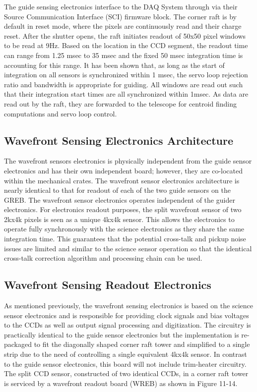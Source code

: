 The guide sensing electronics interface to the DAQ System through via their Source Communication
Interface (SCI) firmware block. The corner raft is by default in reset mode, where the pixels are
continuously read and their charge reset. After the shutter opens, the raft initiates readout of 50x50
pixel windows to be read at 9Hz. Based on the location in the CCD segment, the readout time can range
from 1.25 msec to 35 msec and the fixed 50 msec integration time is accounting for this range. It has
been shown that, as long as the start of integration on all sensors is synchronized within 1 msec, the
servo loop rejection ratio and bandwidth is appropriate for guiding. All windows are read out such that
their integration start times are all synchronized within 1msec. As data are read out by the raft, they are
forwarded to the telescope for centroid finding computations and servo loop control.

\subsection{Wavefront Sensing Electronics Architecture}

The wavefront sensors electronics is physically independent from the guide sensor electronics and has
their own independent board; however, they are co-located within the mechanical crates. The
wavefront sensor electronics architecture is nearly identical to that for readout of each of the two guide
sensors on the GREB. The wavefront sensor electronics operates independent of the guider electronics.
For electronics readout purposes, the split wavefront sensor of two 2kx4k pixels is seen as a unique
4kx4k sensor. This allows the electronics to operate fully synchronously with the science electronics as
they share the same integration time. This guarantees that the potential cross-talk and pickup noise
issues are limited and similar to the science sensor operation so that the identical cross-talk correction
algorithm and processing chain can be used.

\subsection{Wavefront Sensing Readout Electronics}

As mentioned previously, the wavefront sensing electronics is based on the science sensor electronics
and is responsible for providing clock signals and bias voltages to the CCDs as well as output signal
processing and digitization. The circuitry is practically identical to the guide sensor electronics but the
implementation is re-packaged to fit the diagonally shaped corner raft tower and simplified to a single
strip due to the need of controlling a single equivalent 4kx4k sensor. In contrast to the guide sensor
electronics, this board will not include trim-heater circuitry.
The split CCD sensor, constructed of two identical CCDs, in a corner raft tower is serviced by a wavefront
readout board (WREB) as shown in Figure 11-14.

